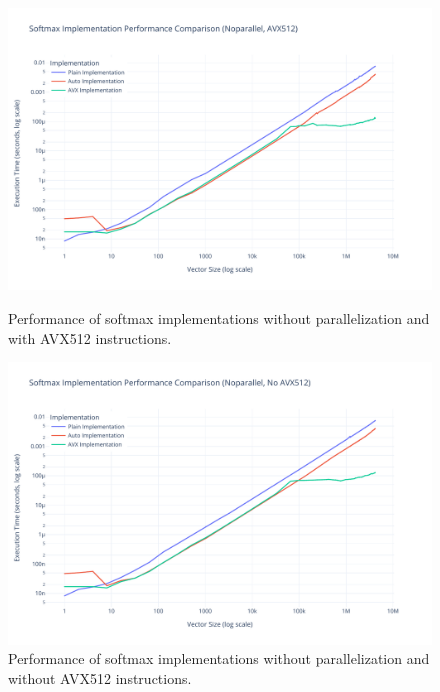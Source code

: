\documentclass[10pt]{article}
\begin{document}
\begin{figure}[H]
  \centering
  \begin{minipage}{0.48\textwidth}
    \centering
    \includegraphics[width=\textwidth]{../images/performance/softmax_noparallel_avx512.pdf}
    \caption{Performance of softmax implementations without parallelization and with AVX512 instructions.}
    \label{fig:perf_noparallel_avx512}
  \end{minipage}
  \hfill
  \begin{minipage}{0.48\textwidth}
    \centering
    \includegraphics[width=\textwidth]{../images/performance/softmax_noparallel_noavx512.pdf}
    \caption{Performance of softmax implementations without parallelization and without AVX512 instructions.}
    \label{fig:perf_noparallel_noavx512}
  \end{minipage}
\end{figure}
\end{document}
